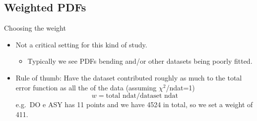 
\author[Zahari Kassabov]{}
\subsection{Weighted PDFs}
\begin{frame}{Choosing the weight}
\protect\hypertarget{choosing-the-weight}{}
\begin{itemize}
\tightlist
\item
  Not a critical setting for this kind of study.

  \begin{itemize}
  \tightlist
  \item
    Typically we see PDFs bending and/or other datasets being poorly
    fitted.
  \end{itemize}
\item
  Rule of thumb: Have the dataset contributed roughly as much to the
  total error function as all the of the data (assuming
  \(\chi^2\)/ndat=1) \[
  w = \text{total ndat}/\text{dataset ndat}
  \] e.g.~DO e ASY has 11 points and we have 4524 in total, so we set a
  weight of 411.

\end{itemize}
\end{frame}